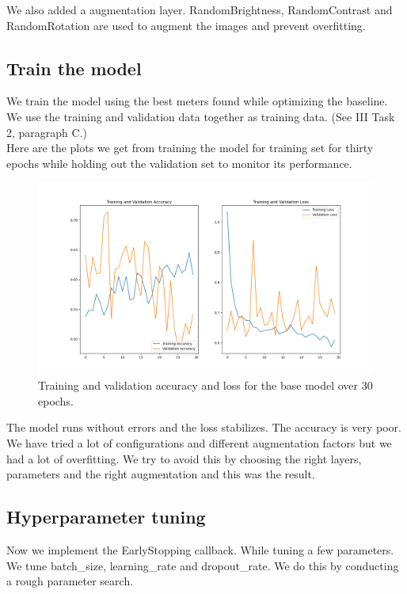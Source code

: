 \documentclass[conference]{IEEEtran}
\begin{document}
We also added a augmentation layer. RandomBrightness, RandomContrast and RandomRotation are used to augment the images and prevent overfitting.\\

\subsection{Train the model}

We train the model using the best meters found while optimizing the
baseline. We use the training and validation data together as training data. 
(See III Task 2, paragraph C.)\\



Here are the plots we get from training the model for training set for thirty epochs while holding out the validation set to monitor its performance.\\

\begin{figure}[htbp]
	\centerline{\includegraphics[width=\linewidth]{Images/Transferlearning_1.png}}
	\caption{Training and validation accuracy and loss for the base model over 30 epochs.}
	\label{fig:transferlearning_1}
\end{figure}

The model runs without errors and the loss stabilizes. The accuracy is very poor. We have tried a lot of configurations and different augmentation factors but we had a lot of overfitting. We try to avoid this by choosing the right layers, parameters and the right augmentation and this was the result.\\



\subsection{Hyperparameter tuning}
Now we implement the EarlyStopping callback. While tuning a few parameters. We tune batch\_size, learning\_rate and dropout\_rate. We do this by conducting a rough parameter search.
\end{document}
